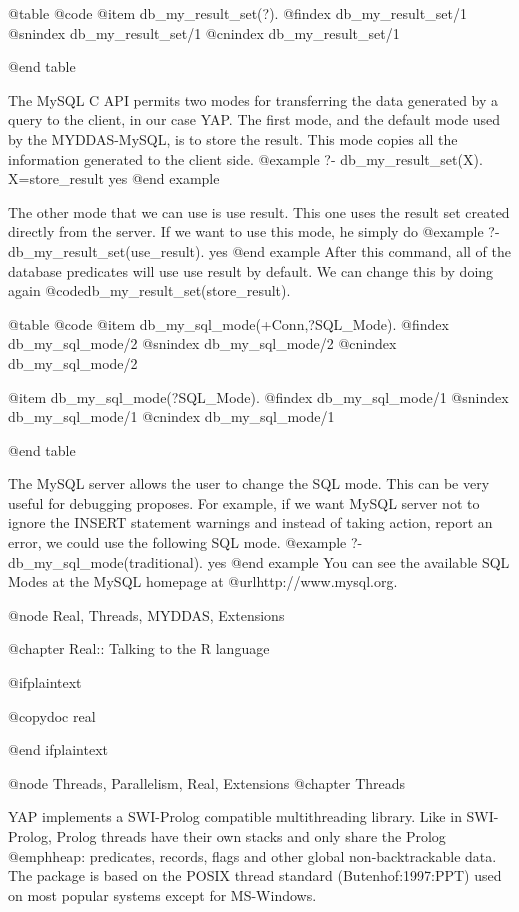 @table @code
@item db_my_result_set(?).
@findex db_my_result_set/1
@snindex db_my_result_set/1
@cnindex db_my_result_set/1

@end table


The MySQL C API permits two modes for transferring the data generated by
a query to the client, in our case YAP. The first mode, and the default
mode used by the MYDDAS-MySQL, is to store the result. This mode copies all the
information generated to the client side.
@example
?- db_my_result_set(X).
X=store_result
yes
@end example


The other mode that we can use is use result. This one uses the result
set created directly from the server. If we want to use this mode, he
simply do
@example
 ?- db_my_result_set(use_result). 
yes
@end example
After this command, all
of the database predicates will use use result by default. We can change
this by doing again @code{db_my_result_set(store_result)}.  

@table @code
@item db_my_sql_mode(+Conn,?SQL_Mode).
@findex db_my_sql_mode/2
@snindex db_my_sql_mode/2
@cnindex db_my_sql_mode/2

@item db_my_sql_mode(?SQL_Mode).
@findex db_my_sql_mode/1
@snindex db_my_sql_mode/1
@cnindex db_my_sql_mode/1

@end table

The MySQL server allows the user to change the SQL mode. This can be
very useful for debugging proposes. For example, if we want MySQL server
not to ignore the INSERT statement warnings and instead of taking
action, report an error, we could use the following SQL mode.
@example
  ?-db_my_sql_mode(traditional). yes
@end example
You can see the available SQL Modes at the MySQL homepage at
@url{http://www.mysql.org}.

@node Real, Threads, MYDDAS, Extensions

@chapter Real::   Talking to the R language 

@ifplaintext

@copydoc real

@end ifplaintext

@node Threads, Parallelism, Real, Extensions
@chapter Threads

YAP implements a SWI-Prolog compatible multithreading
library. Like in SWI-Prolog, Prolog threads have their own stacks and
only share the Prolog @emph{heap}: predicates, records, flags and other
global non-backtrackable data.  The package is based on the POSIX thread
standard (Butenhof:1997:PPT) used on most popular systems except
for MS-Windows.

